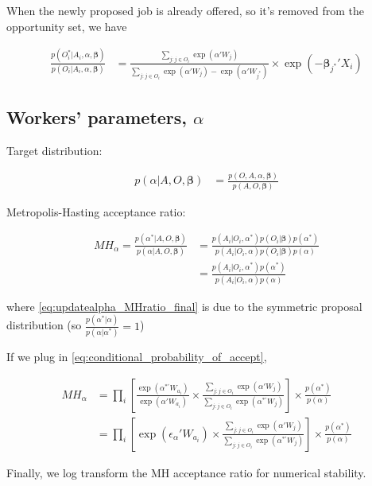 When the newly proposed job is already offered, so it's removed from the opportunity set, we have

\begin{align}
\frac{p(O_i^* | A_i, \alpha, \bm{\beta})}{p(O_i | A_i, \alpha, \bm{\beta})} &= \frac{\sum\limits_{j:j \in O_i} \exp(\alpha'W_j)}{\sum\limits_{j:j \in O_i} \exp(\alpha'W_j) - \exp(\alpha' W_{j^*})} \times \exp(- \bm{\beta}_{j^*}'X_i)
\end{align}

\subsection{Workers' parameters, \texorpdfstring{$\alpha$}{alpha}}

Target distribution:

\begin{align}
p(\alpha | A, O, \bm{\beta}) &= \frac{p(O, A, \alpha, \bm{\beta})}{p(A, O, \bm{\beta})}
\end{align}

Metropolis-Hasting acceptance ratio:

\begin{align}
MH_\alpha = \frac{p(\alpha^* | A, O, \bm{\beta})}{p(\alpha | A, O, \bm{\beta})} &= \frac{p(A_i | O_i, \alpha^*)p(O_i|\bm{\beta}) p(\alpha^*)}{p(A_i | O_i, \alpha)p(O_i|\bm{\beta}) p(\alpha)} \\
&= \frac{p(A_i | O_i, \alpha^*)p(\alpha^*)}{p(A_i | O_i, \alpha) p(\alpha)} \label{eq:updatealpha_MHratio_final}
\end{align}

where \eqref{eq:updatealpha_MHratio_final} is due to the symmetric proposal distribution (so $\frac{p(\alpha^*|\alpha)}{p(\alpha|\alpha^*)} = 1$)

If we plug in \eqref{eq:conditional_probability_of_accept},

\begin{align}
MH_\alpha &= \prod_i \left[ \frac{\exp(\alpha^{*\prime} W_{a_i})}{\exp(\alpha' W_{a_i})} \times \frac{\sum\limits_{j:j \in O_i} \exp(\alpha' W_j)}{\sum\limits_{j:j \in O_i} \exp(\alpha^{*\prime}W_j)} \right] \times \frac{p(\alpha^*)}{p(\alpha)}\\
&= \prod_i \left[ \exp(\epsilon_\alpha ' W_{a_i}) \times \frac{\sum\limits_{j:j \in O_i} \exp(\alpha' W_j)}{\sum\limits_{j:j \in O_i} \exp(\alpha^{*\prime}W_j)} \right] \times \frac{p(\alpha^*)}{p(\alpha)}
\end{align}

Finally, we log transform the MH acceptance ratio for numerical stability.


